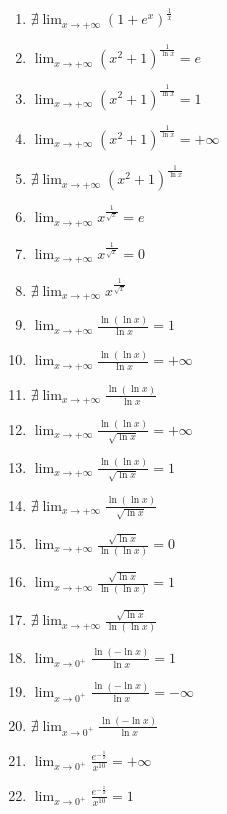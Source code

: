 \documentclass[11pt,a4paper]{article}
\begin{document}
\begin{enumerate}
\item $\displaystyle \nexists \lim_{x \to +\infty} \left(1 + e^{x}\right)^{\frac{1}{x}}$
\item $\displaystyle \lim_{x \to +\infty} \left(x^{2} + 1\right)^{\frac{1}{\ln x}} = e$
\item $\displaystyle \lim_{x \to +\infty} \left(x^{2} + 1\right)^{\frac{1}{\ln x}} = 1$
\item $\displaystyle \lim_{x \to +\infty} \left(x^{2} + 1\right)^{\frac{1}{\ln x}} = +\infty$
\item $\displaystyle \nexists \lim_{x \to +\infty} \left(x^{2} + 1\right)^{\frac{1}{\ln x}}$
\item $\displaystyle \lim_{x \to +\infty} x^{\frac{1}{\sqrt{x}}} = e$
\item $\displaystyle \lim_{x \to +\infty} x^{\frac{1}{\sqrt{x}}} = 0$
\item $\displaystyle \nexists \lim_{x \to +\infty} x^{\frac{1}{\sqrt{x}}}$
\item $\displaystyle \lim_{x \to +\infty} \frac{\ln(\ln x)}{\ln x} = 1$
\item $\displaystyle \lim_{x \to +\infty} \frac{\ln(\ln x)}{\ln x} = +\infty$
\item $\displaystyle \nexists \lim_{x \to +\infty} \frac{\ln(\ln x)}{\ln x}$
\item $\displaystyle \lim_{x \to +\infty} \frac{\ln(\ln x)}{\sqrt{\ln x}} = +\infty$
\item $\displaystyle \lim_{x \to +\infty} \frac{\ln(\ln x)}{\sqrt{\ln x}} = 1$
\item $\displaystyle \nexists \lim_{x \to +\infty} \frac{\ln(\ln x)}{\sqrt{\ln x}}$
\item $\displaystyle \lim_{x \to +\infty} \frac{\sqrt{\ln x}}{\ln(\ln x)} = 0$
\item $\displaystyle \lim_{x \to +\infty} \frac{\sqrt{\ln x}}{\ln(\ln x)} = 1$
\item $\displaystyle \nexists \lim_{x \to +\infty} \frac{\sqrt{\ln x}}{\ln(\ln x)}$
\item $\displaystyle \lim_{x \to 0^{+}} \frac{\ln(-\ln x)}{\ln x} = 1$
\item $\displaystyle \lim_{x \to 0^{+}} \frac{\ln(-\ln x)}{\ln x} = -\infty$
\item $\displaystyle \nexists \lim_{x \to 0^{+}} \frac{\ln(-\ln x)}{\ln x}$
\item $\displaystyle \lim_{x \to 0^{+}} \frac{e^{-\frac{1}{x}}}{x^{10}} = +\infty$
\item $\displaystyle \lim_{x \to 0^{+}} \frac{e^{-\frac{1}{x}}}{x^{10}} = 1$

\end{enumerate}
\end{document}
